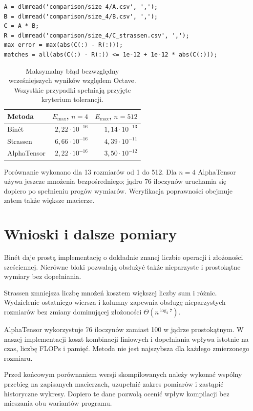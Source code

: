 \documentclass[11pt,a4paper]{article}
\begin{document}
\begin{lstlisting}[caption={Odtworzenie przykładu w GNU Octave.}]
A = dlmread('comparison/size_4/A.csv', ',');
B = dlmread('comparison/size_4/B.csv', ',');
C = A * B;
R = dlmread('comparison/size_4/C_strassen.csv', ',');
max_error = max(abs(C(:) - R(:)));
matches = all(abs(C(:) - R(:)) <= 1e-12 + 1e-12 * abs(C(:)));
\end{lstlisting}

\begin{table}[htbp]
\centering
\begin{tabular}{@{}lrr@{}}
\toprule
Metoda & $E_{\max}$, $n=4$ & $E_{\max}$, $n=512$\\
\midrule
Binét & $2{,}22\cdot10^{-16}$ & $1{,}14\cdot10^{-13}$\\
Strassen & $6{,}66\cdot10^{-16}$ & $4{,}39\cdot10^{-11}$\\
AlphaTensor & $2{,}22\cdot10^{-16}$ & $3{,}50\cdot10^{-12}$\\
\bottomrule
\end{tabular}
\caption{Maksymalny błąd bezwzględny wcześniejszych wyników względem Octave.
Wszystkie przypadki spełniają przyjęte kryterium tolerancji.}
\end{table}

Porównanie wykonano dla 13 rozmiarów od 1 do 512.
Dla $n=4$ AlphaTensor używa jeszcze mnożenia bezpośredniego;
jądro 76 iloczynów uruchamia się dopiero po spełnieniu progów wymiarów.
Weryfikacja poprawności obejmuje zatem także większe macierze.

\section{Wnioski i dalsze pomiary}
Binét daje prostą implementację o dokładnie znanej liczbie operacji
i złożoności sześciennej. Nierówne bloki pozwalają obsłużyć także
nieparzyste i prostokątne wymiary bez dopełniania.

Strassen zmniejsza liczbę mnożeń kosztem większej liczby sum i różnic.
Wydzielenie ostatniego wiersza i kolumny zapewnia obsługę nieparzystych
rozmiarów bez zmiany dominującej złożoności $\Theta(n^{\log_2 7})$.

AlphaTensor wykorzystuje 76 iloczynów zamiast 100 w jądrze prostokątnym.
W naszej implementacji koszt kombinacji liniowych i dopełniania
wpływa istotnie na czas, liczbę FLOPs i pamięć.
Metoda nie jest najszybsza dla każdego zmierzonego rozmiaru.

Przed końcowym porównaniem wersji skompilowanych należy wykonać wspólny
przebieg na zapisanych macierzach, uzupełnić zakres pomiarów i zastąpić
historyczne wykresy. Dopiero te dane pozwolą ocenić wpływ kompilacji
bez mieszania obu wariantów programu.
\end{document}

